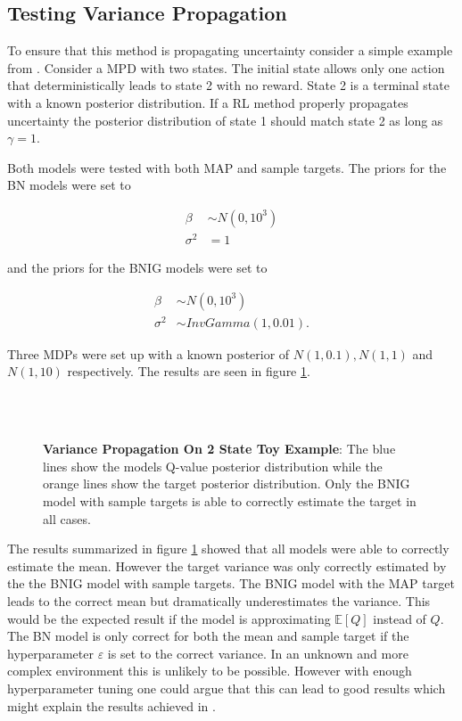 \subsection{Testing Variance Propagation}

To ensure that this method is propagating uncertainty consider a simple example from \cite{osband_2018}. Consider a MPD with two states. The initial state allows only one action that deterministically leads to state 2 with no reward. State 2 is a terminal state with a known posterior distribution. If a RL method properly propagates uncertainty the posterior distribution of state 1 should match state 2 as long as $\gamma=1$. 

Both models were tested with both MAP and sample targets. The priors for the BN models were set to

\begin{align*}
    \beta &\sim N(0,10^3)\\
    \sigma^2 &= 1
\end{align*}

and the priors for the BNIG models were set to

\begin{align*}
    \beta &\sim N(0,10^3) \\
    \sigma^2 &\sim InvGamma(1, 0.01).
\end{align*}

Three MDPs were set up with a known posterior of $N(1, 0.1), N(1, 1)$ and $N(1, 10)$ respectively. The results are seen in figure \ref{fig:proptest}.

\begin{figure}[H]
    \centering
    \\
    \\
    \caption{\textbf{Variance Propagation On 2 State Toy Example}: The blue lines show the models Q-value posterior distribution while the orange lines show the target posterior distribution. Only the BNIG model with sample targets is able to correctly estimate the target in all cases.}
    \label{fig:proptest}
\end{figure}

The results summarized in figure \ref{fig:proptest} showed that all models were able to correctly estimate the mean. However the target variance was only correctly estimated by the the BNIG model with sample targets. The BNIG model with the MAP target leads to the correct mean but dramatically underestimates the variance. This would be the expected result if the model is approximating $\mathbb{E}[Q]$ instead of $Q$. The BN model is only correct for both the mean and sample target if the hyperparameter $\varepsilon$ is set to the correct variance. In an unknown and more complex environment this is unlikely to be possible. However with enough hyperparameter tuning one could argue that this can lead to good results which might explain the results achieved in \cite{azziz_2018}.

